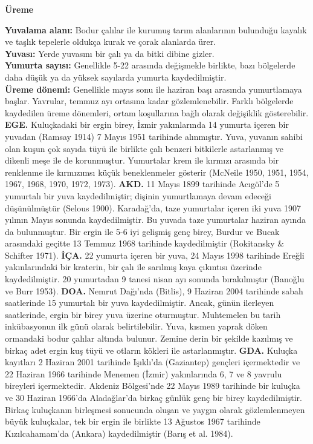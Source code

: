 \documentclass[
  letterpaper,
  DIV=11,
  numbers=noendperiod]{scrreprt}
\begin{document}
\textbf{Üreme}

\textbf{Yuvalama alanı:} Bodur çalılar ile kurumuş tarım alanlarının
bulunduğu kayalık ve taşlık tepelerle oldukça kurak ve çorak alanlarda
ürer.\\
\textbf{Yuvası:} Yerde yuvasını bir çalı ya da bitki dibine gizler.\\
\textbf{Yumurta sayısı:} Genellikle 5-22 arasında değişmekle birlikte,
bazı bölgelerde daha düşük ya da yüksek sayılarda yumurta
kaydedilmiştir.\\
\textbf{Üreme dönemi:} Genellikle mayıs sonu ile haziran başı arasında
yumurtlamaya başlar. Yavrular, temmuz ayı ortasına kadar
gözlemlenebilir. Farklı bölgelerde kaydedilen üreme dönemleri, ortam
koşullarına bağlı olarak değişiklik gösterebilir. \textbf{EGE.}
Kuluçkadaki bir ergin birey, İzmir yakınlarında 14 yumurta içeren bir
yuvadan (Ramsay 1914) 7 Mayıs 1951 tarihinde alınmıştır. Yuva, yuvanın
sahibi olan kuşun çok sayıda tüyü ile birlikte çalı benzeri bitkilerle
astarlanmış ve dikenli meşe ile de korunmuştur. Yumurtalar krem ile
kırmızı arasında bir renklenme ile kırmızımsı küçük beneklenmeler
gösterir (McNeile 1950, 1951, 1954, 1967, 1968, 1970, 1972, 1973).
\textbf{AKD.} 11 Mayıs 1899 tarihinde Acıgöl'de 5 yumurtalı bir yuva
kaydedilmiştir; dişinin yumurtlamaya devam edeceği düşünülmüştür (Selous
1900). Karadağ'da, taze yumurtalar içeren iki yuva 1907 yılının Mayıs
sonunda kaydedilmiştir. Bu yuvada taze yumurtalar haziran ayında da
bulunmuştur. Bir ergin ile 5-6 iyi gelişmiş genç birey, Burdur ve Bucak
arasındaki geçitte 13 Temmuz 1968 tarihinde kaydedilmiştir (Rokitansky
\& Schifter 1971). \textbf{İÇA.} 22 yumurta içeren bir yuva, 24 Mayıs
1998 tarihinde Ereğli yakınlarındaki bir kraterin, bir çalı ile sarılmış
kaya çıkıntısı üzerinde kaydedilmiştir. 20 yumurtadan 9 tanesi nisan ayı
sonunda bırakılmıştır (Banoğlu ve Burr 1953). \textbf{DOA.} Nemrut
Dağı'nda (Bitlis), 9 Haziran 2004 tarihinde sabah saatlerinde 15
yumurtalı bir yuva kaydedilmiştir. Ancak, günün ilerleyen saatlerinde,
ergin bir birey yuva üzerine oturmuştur. Muhtemelen bu tarih
inkübasyonun ilk günü olarak belirtilebilir. Yuva, kısmen yaprak döken
ormandaki bodur çalılar altında bulunur. Zemine derin bir şekilde
kazılmış ve birkaç adet ergin kuş tüyü ve otların kökleri ile
astarlanmıştır. \textbf{GDA.} Kuluçka kayıtları 2 Haziran 2001 tarihinde
Işıklı'da (Gaziantep) gençleri içermektedir ve 22 Haziran 1966 tarihinde
Menemen (İzmir) yakınlarında 6, 7 ve 8 yavrulu bireyleri içermektedir.
Akdeniz Bölgesi'nde 22 Mayıs 1989 tarihinde bir kuluçka ve 30 Haziran
1966'da Aladağlar'da birkaç günlük genç bir birey kaydedilmiştir. Birkaç
kuluçkanın birleşmesi sonucunda oluşan ve yaygın olarak gözlemlenmeyen
büyük kuluçkalar, tek bir ergin ile birlikte 13 Ağustos 1967 tarihinde
Kızılcahamam'da (Ankara) kaydedilmiştir (Barış et al. 1984).
\end{document}
